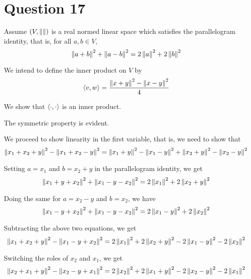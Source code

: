 \section{Question 17}

Assume $\left( V, \left\lVert  \right\rVert \right)$ is a real normed linear space which satisfies the parallelogram identity, that is, for all $a,b \in V$, 
\begin{equation*}
    \left\lVert a+b \right\rVert^{2} + \left\lVert a-b \right\rVert^{2} = 2\left\lVert a \right\rVert^{2} +2 \left\lVert b \right\rVert^{2}
\end{equation*}

We intend to define the inner product on $V$ by
\begin{align*}
    \left\langle v,w \right\rangle = \frac{\left\lVert x+y \right\rVert^{2} - \left\lVert x-y \right\rVert^{2}}{4}
\end{align*}

We show that $\left\langle \cdot, \cdot \right\rangle$ is an inner product.

The symmetric property is evident.

We proceed to show linearity in the first variable, that is, we need to show that 
\begin{align*}
    \left\lVert x_{1} + x_{2} + y \right\rVert^{2} - \left\lVert x_{1}+x_{2}-y \right\rVert^{2} = \left\lVert x_{1} + y \right\rVert^2-\left\lVert x_{1}-y \right\rVert^{2} + \left\lVert x_{2}+y \right\rVert^{2} - \left\lVert x_{2}-y \right\rVert^{2}
\end{align*}

Setting $a=x_{1} $ and $b=x_{2}+y$ in the parallelogram identity, we get
\begin{align*}
    \left\lVert x_{1} + y + x_{2} \right\rVert^{2} + \left\lVert x_{1} - y - x_{2} \right\rVert^{2} = 2 \left\lVert x_{1}  \right\rVert ^{2} + 2 \left\lVert x_{2} + y \right\rVert^{2}
\end{align*}

Doing the same for $a=x_{2} -y $ and $b=x_{2}$, we have
\begin{align*}
    \left\lVert x_{1} - y + x_{2} \right\rVert^{2} + \left\lVert x_{1} - y - x_{2} \right\rVert^{2} = 2 \left\lVert x_{1} -y \right\rVert ^{2} + 2 \left\lVert x_{2} \right\rVert^{2}
\end{align*}

Subtracting the above two equations, we get
\begin{align*}
    \left\lVert x_{1} + x_{2} + y \right\rVert^{2} - \left\lVert x_{1} - y + x_{2} \right\rVert ^{2} = 2\left\lVert x_{1} \right\rVert^{2} + 2 \left\lVert x_{2} + y \right\rVert ^{2} - 2 \left\lVert x_{1} - y \right\rVert^{2} - 2 \left\lVert x_{2} \right\rVert^{2}
\end{align*}
 
Switching the roles of $x_{2}$ and $x_{1}$, we get
\begin{align*}
    \left\lVert x_{2} + x_{1} + y \right\rVert^{2} - \left\lVert x_{2} - y + x_{1} \right\rVert ^{2} = 2\left\lVert x_{2} \right\rVert^{2} + 2 \left\lVert x_{1} + y \right\rVert ^{2} - 2 \left\lVert x_{2} - y \right\rVert^{2} - 2 \left\lVert x_{1} \right\rVert^{2}
\end{align*}

